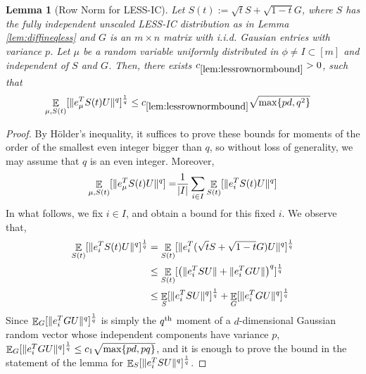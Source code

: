 \documentclass[11pt]{amsart}
\numberwithin{equation}{section}
\numberwithin{equation}{section}
\DeclareMathOperator{\E}{\mathbb{E}}
\DeclarePairedDelimiter{\norm}{\lVert}{\rVert}
\DeclarePairedDelimiter{\abs}{\lvert}{\rvert}
\DeclarePairedDelimiter{\paren}{(}{)}
\newtheorem{lemma}[theorem]{Lemma}
\theoremstyle{remark}
\theoremstyle{definition}
\begin{document}
\begin{lemma}[Row Norm for LESS-IC]\label{lem:lessrownormbound}
    Let $S(t):= \sqrt{t}S + \sqrt{1-t}G$, where $S$ has the fully independent unscaled LESS-IC distribution as in Lemma \ref{lem:diffineqless} and $G$ is an $m \times n$ matrix with i.i.d. Gausian entries with variance $p$. Let $\mu$ be a random variable uniformly distributed in $\phi \neq I \subset [m]$ and independent of $S$ and $G$. Then, there exists $c_{\ref*{lem:lessrownormbound}} > 0$, such that 
    \begin{align*}
        \E_{\mu, S(t)} [ \norm{e_{\mu}^TS(t)U}^{q} ]^\frac{1}{q} &\le c_{\ref*{lem:lessrownormbound}}\sqrt{\max \{ pd, q^2 \}} 
    \end{align*}
\end{lemma}
\begin{proof}
    By Hölder's inequality, it suffices to prove these bounds for moments of the order of the smallest even integer bigger than $q$, so without loss of generality, we may assume that $q$ is an even integer. Moreover,
    \begin{align*}
        \E_{\mu, S(t)} [ \norm{e_{\mu}^TS(t)U}^{q}] =& \frac{1}{\abs{I}}\sum_{i \in I} \E_{S(t)} [ \norm{e_{i}^TS(t)U}^{q}] \\
    \end{align*}
    In what follows, we fix $i \in I$, and obtain a bound for this fixed $i$. We observe that, 
\begin{align*}
    \E_{S(t)} [ \norm{e_{i}^TS(t)U}^{q}]^\frac{1}{q} &= \E_{S(t)} [ \norm{e_{i}^T(\sqrt{t}S + \sqrt{1-t}G)U}^{q}]^\frac{1}{q} \\
    &\le \E_{S(t)} [ \paren*{ \norm{e_{i}^TSU} + \norm{e_{i}^TGU} }^{q}]^\frac{1}{q} \\
    &\le \E_{S} [ \norm{e_{i}^TSU}^{q}]^\frac{1}{q} + \E_{G} [ \norm{e_{i}^TGU}^{q}]^\frac{1}{q}
\end{align*}
Since $\E_{G} [ \norm{e_{i}^TGU}^{q}]^\frac{1}{q}$ is simply the $q\textsuperscript{th}$ moment of a $d$-dimensional Gaussian random vector whose independent components have variance $p$,  $\E_{G} [ \norm{e_{i}^TGU}^{q}]^\frac{1}{q} \le c_1\sqrt{\max \{pd, pq \}}$, and it is enough to prove the bound in the statement of the lemma for $\E_{S} [ \norm{e_{i}^TSU}^{q}]^\frac{1}{q}$.



\end{proof}
\end{document}
